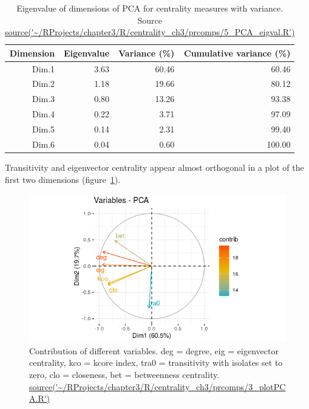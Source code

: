 \begin{table}[ht]
\centering
\begin{tabular}{rrrr}
  \hline
Dimension & Eigenvalue & Variance (\%) & Cumulative variance (\%) \\ 
  \hline
Dim.1 & 3.63 & 60.46 & 60.46 \\ 
  Dim.2 & 1.18 & 19.66 & 80.12 \\ 
  Dim.3 & 0.80 & 13.26 & 93.38 \\ 
  Dim.4 & 0.22 & 3.71 & 97.09 \\ 
  Dim.5 & 0.14 & 2.31 & 99.40 \\ 
  Dim.6 & 0.04 & 0.60 & 100.00 \\ 
   \hline
\end{tabular}
\caption[Variance explained by PCA components of centrality measures]{Eigenvalue of dimensions of PCA for centrality measures with variance. Source \url{source('~/RProjects/chapter3/R/centrality_ch3/prcomps/5_PCA_eigval.R')}} 
\label{tab:Eigenvalue of dimensions of PCA for centrality measures with variance}
\end{table}
Transitivity and eigenvector centrality appear almost orthogonal in a plot of the first two dimensions (figure~\ref{fig:PCA_contributions}).



\begin{figure}
    \centering
    \includegraphics[width=\textwidth]{images/chapter3/centrality_pca_factoextra/Rplot_smaller_pca.png}
    \caption{Contribution of different variables. deg = degree, eig = eigenvector centrality, kco = kcore index, tra0 = transitivity with isolates set to zero, clo = closeness, bet = betweenness centrality.  \url{source('~/RProjects/chapter3/R/centrality_ch3/prcomps/3_plotPCA.R')}}
    \label{fig:PCA_contributions}
\end{figure}

